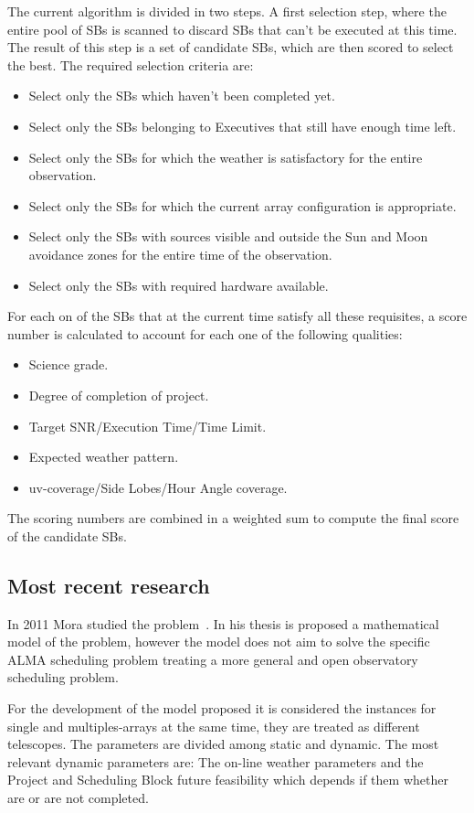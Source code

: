 The current algorithm is divided in two steps. A first selection step, where the entire pool of SBs is scanned to discard SBs that can't be executed at this time. The result of this step is a set of candidate SBs, which are then scored to select the best. The required selection criteria are:
\begin{itemize}
\item Select only the SBs which haven't been completed yet.
\item Select only the SBs belonging to Executives that still have enough time left.
\item Select only the SBs for which the weather is satisfactory for the entire observation.
\item Select only the SBs for which the current array configuration is appropriate.
\item Select only the SBs with sources visible and outside the Sun and Moon avoidance zones for the entire time of the observation.
\item Select only the SBs with required hardware available.
\end{itemize}

For each on of the SBs that at the current time satisfy all these requisites, a score number is calculated to account for each one of the following qualities:
\begin{itemize}
\item Science grade.
\item Degree of completion of project.
\item Target SNR/Execution Time/Time Limit.
\item Expected weather pattern.
\item uv-coverage/Side Lobes/Hour Angle coverage.
\end{itemize}
The scoring numbers are combined in a weighted sum to compute the final score of the
candidate SBs.

\subsection{Most recent research}
In 2011 Mora studied the problem~\cite{mora11}. In his thesis is proposed a mathematical model of the problem, however the model does not aim to solve the specific ALMA scheduling problem treating a more general and open observatory scheduling problem. 

For the development of the model proposed it is considered the instances for single and multiples-arrays at the same time, they are treated as different telescopes. The parameters are divided among static and dynamic. The most relevant dynamic parameters are: The on-line weather parameters and the Project and Scheduling Block future feasibility which depends if them whether are or are not completed.

